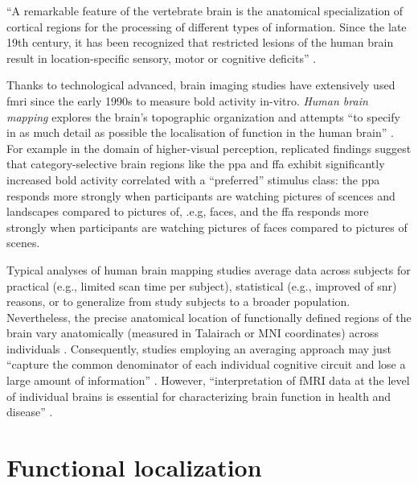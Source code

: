 
%
``A remarkable feature of the vertebrate brain is the anatomical specialization
of cortical regions for the processing of different types of information. Since
the late 19th century, it has been recognized that restricted lesions of the
human brain result in location-specific sensory, motor or cognitive deficits''
\citep{cohen1994localization}.


%
Thanks to technological advanced, brain imaging studies have extensively used
\ac{fmri} since the early 1990s to measure \ac{bold} activity in-vitro.
%
\textit{Human brain mapping} \citep[e.g.,][]{raichle2009brief} explores the
brain's topographic organization \citep[e.g.,][]{eickhoff2018topographic} and
attempts ``to specify in as much detail as possible the localisation of function
in the human brain'' \citep{savoy2001history}.
For example in the domain of higher-visual perception, replicated findings
suggest that category-selective brain regions like the \ac{ppa}
\citep{epstein1998ppa, epstein1999parahippocampal} and \ac{ffa}
\citep{kanwisher1997ffa, kanwisher2006fusiform} exhibit significantly increased
\ac{bold} activity correlated with a ``preferred'' stimulus class: the \ac{ppa}
responds more strongly when participants are watching pictures of scences and
landscapes compared to pictures of, .e.g, faces, and the \ac{ffa} responds more
strongly when participants are watching pictures of faces compared to pictures
of scenes.

%
Typical analyses of human brain mapping studies average data across subjects for
practical (e.g., limited scan time per subject), statistical (e.g., improved
of \ac{snr}) reasons, or to generalize from study subjects to a broader
population.
%
Nevertheless, the precise anatomical location of functionally defined regions of
the brain vary anatomically (measured in Talairach or MNI coordinates) across
individuals \citep{friston2006critique, saxe2006divide}.
%
Consequently, studies employing an averaging approach may just ``capture the
common denominator of each individual cognitive circuit and lose a large amount
of information'' \citep{pinel2007fast}.
%
However, ``interpretation of fMRI data at the level of individual brains is
essential for characterizing brain function in health and disease''
\citep{dubois2016building}.


\section{Functional localization}

